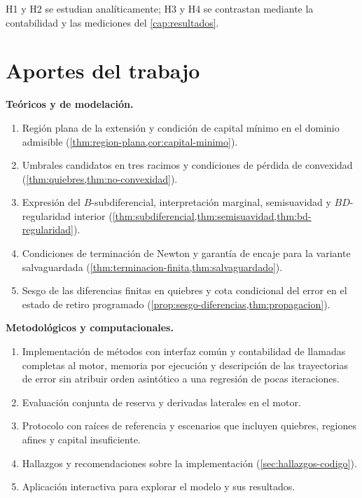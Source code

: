H1 y H2 se estudian analíticamente; H3 y H4 se contrastan mediante la contabilidad
y las mediciones del \cref{cap:resultados}.

\section{Aportes del trabajo}
\label{sec:aportes}

\begin{aporte}
\textbf{Teóricos y de modelación.}
\begin{enumerate}[leftmargin=*,nosep]
  \item Región plana de la extensión y condición de capital mínimo en el dominio
        admisible (\cref{thm:region-plana,cor:capital-minimo}).
  \item Umbrales candidatos en tres racimos y condiciones de pérdida de convexidad
        (\cref{thm:quiebres,thm:no-convexidad}).
  \item Expresión del $B$-subdiferencial, interpretación marginal, semisuavidad y
        $BD$-regularidad interior
        (\cref{thm:subdiferencial,thm:semisuavidad,thm:bd-regularidad}).
  \item Condiciones de terminación de Newton y garantía de encaje para la variante
        salvaguardada (\cref{thm:terminacion-finita,thm:salvaguardado}).
  \item Sesgo de las diferencias finitas en quiebres y cota condicional del error
        en el estado de retiro programado
        (\cref{prop:sesgo-diferencias,thm:propagacion}).
\end{enumerate}

\textbf{Metodológicos y computacionales.}
\begin{enumerate}[leftmargin=*,nosep,resume]
  \item Implementación de \datoNMetodos{} métodos con interfaz común y
        contabilidad de llamadas completas al motor, memoria por ejecución y
        descripción de las trayectorias de error sin atribuir orden asintótico
        a una regresión de pocas iteraciones.
  \item Evaluación conjunta de reserva y derivadas laterales en el motor.
  \item Protocolo con raíces de referencia y escenarios que incluyen quiebres,
        regiones afines y capital insuficiente.
  \item Hallazgos y recomendaciones sobre la implementación
        (\cref{sec:hallazgos-codigo}).
  \item Aplicación interactiva para explorar el modelo y sus resultados.
\end{enumerate}
\end{aporte}

